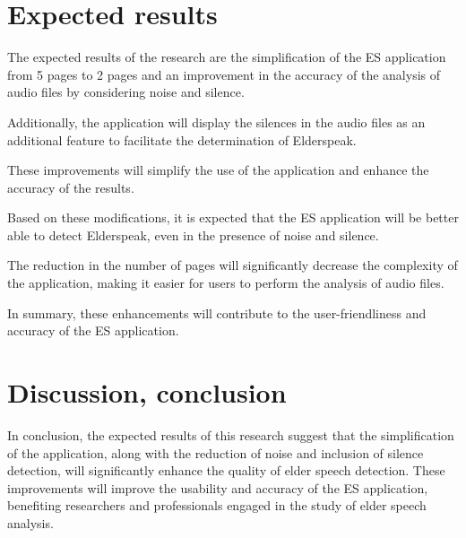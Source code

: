 \documentclass[english]{hogent-article}
\begin{document}
\section{Expected results}%
\label{sec:expected-results}


The expected results of the research are the simplification of the ES application from 5 pages to 2 pages and an improvement in the accuracy of the analysis of audio files by considering noise and silence.

Additionally, the application will display the silences in the audio files as an additional feature to facilitate the determination of Elderspeak.

These improvements will simplify the use of the application and enhance the accuracy of the results.

Based on these modifications, it is expected that the ES application will be better able to detect Elderspeak, even in the presence of noise and silence.

The reduction in the number of pages will significantly decrease the complexity of the application, making it easier for users to perform the analysis of audio files.

In summary, these enhancements will contribute to the user-friendliness and accuracy of the ES application.

\section{Discussion, conclusion}%
\label{sec:discussion-conclusion}

In conclusion, the expected results of this research suggest that the simplification of the application, along with the reduction of noise and inclusion of silence detection, will significantly enhance the quality of elder speech detection. These improvements will improve the usability and accuracy of the ES application, benefiting researchers and professionals engaged in the study of elder speech analysis.


\printbibliography[heading=bibintoc]
\end{document}
